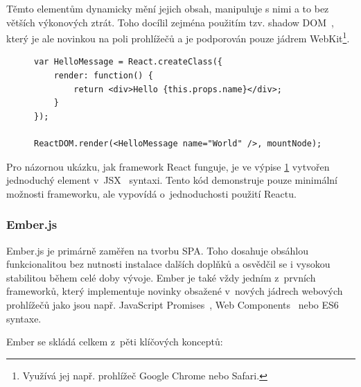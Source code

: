 Těmto elementům dynamicky mění jejich obsah, manipuluje s nimi a to bez větších výkonových ztrát. Toho docílil zejména použitím tzv. shadow DOM~\cite{shadowdom}, který je ale novinkou na poli prohlížečů a je podporován pouze jádrem WebKit\footnote{Využívá jej např. prohlížeč Google Chrome nebo Safari.}. 


\begin{figure}[ht]
\lstset{basicstyle=\small,style=JSON}
\begin{lstlisting}
var HelloMessage = React.createClass({
    render: function() {
        return <div>Hello {this.props.name}</div>;
    }
});

ReactDOM.render(<HelloMessage name="World" />, mountNode);
\end{lstlisting}
\label{code:react}
\end{figure}

Pro názornou ukázku, jak framework React funguje, je ve výpise \ref{code:react} vytvořen jednoduchý  element v~JSX~\cite{jsx} syntaxi. Tento kód demonstruje pouze minimální možnosti frameworku, ale vypovídá o~jednoduchosti použití Reactu.

\subsubsection*{Ember.js}

Ember.js je primárně zaměřen na tvorbu SPA. Toho dosahuje obsáhlou funkcionalitou bez nutnosti instalace dalších doplňků a osvědčil se i vysokou stabilitou během celé doby vývoje. Ember je také vždy jedním z~prvních frameworků, který implementuje novinky obsažené v~nových jádrech webových prohlížečů jako jsou např. JavaScript Promises~\cite{jspromises}, Web Components~\cite{webcomponents} nebo ES6 syntaxe.

Ember se skládá celkem z~pěti klíčových konceptů:

